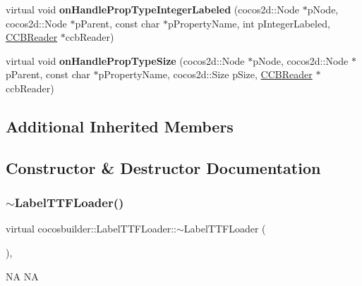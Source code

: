 \begin{DoxyCompactItemize}
virtual void {\bfseries on\+Handle\+Prop\+Type\+Integer\+Labeled} (cocos2d\+::\+Node $\ast$p\+Node, cocos2d\+::\+Node $\ast$p\+Parent, const char $\ast$p\+Property\+Name, int p\+Integer\+Labeled, \hyperlink{classcocosbuilder_1_1CCBReader}{C\+C\+B\+Reader} $\ast$ccb\+Reader)
\item 
\mbox{\label{classcocosbuilder_1_1LabelTTFLoader_ac1d3a2c9f148c7aecef61811e1f403b4}} 
virtual void {\bfseries on\+Handle\+Prop\+Type\+Size} (cocos2d\+::\+Node $\ast$p\+Node, cocos2d\+::\+Node $\ast$p\+Parent, const char $\ast$p\+Property\+Name, cocos2d\+::\+Size p\+Size, \hyperlink{classcocosbuilder_1_1CCBReader}{C\+C\+B\+Reader} $\ast$ccb\+Reader)
\end{DoxyCompactItemize}
\subsection*{Additional Inherited Members}


\subsection{Constructor \& Destructor Documentation}
\mbox{\label{classcocosbuilder_1_1LabelTTFLoader_ac53c82a480c93a10a7279d26df79a343}} 
\subsubsection{\texorpdfstring{$\sim$\+Label\+T\+T\+F\+Loader()}{~LabelTTFLoader()}\hspace{0.1cm}{\footnotesize\ttfamily [1/2]}}
{\footnotesize\ttfamily virtual cocosbuilder\+::\+Label\+T\+T\+F\+Loader\+::$\sim$\+Label\+T\+T\+F\+Loader (\begin{DoxyParamCaption}{ }\end{DoxyParamCaption})\hspace{0.3cm}{\ttfamily [inline]}, {\ttfamily [virtual]}}

NA  NA \mbox{\label{classcocosbuilder_1_1LabelTTFLoader_ac53c82a480c93a10a7279d26df79a343}} 
